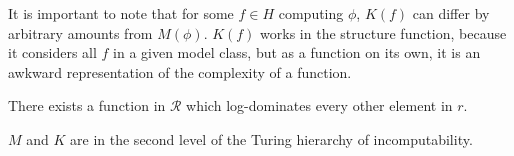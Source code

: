 \documentclass{style/llncs}
\newcommand{\R}{{\mathscr R}}
\begin{document}
{It is important to note that for some $f \in H$ computing $\phi$, $K(f)$ can differ by arbitrary amounts from $M(\phi)$. $K(f)$ works in the structure function, because it considers all $f$ in a given model class, but as a function on its own, it is an awkward representation of the complexity of a function.

\begin{theorem}
There exists a function in $\R$ which log-dominates every other element in $r$. 
\end{theorem}

\begin{theorem}
$M$ and $K$ are in the second level of the Turing hierarchy of incomputability. 
\end{theorem}

\begin{theorem}
\cite{DBLP:journals/cj/Shen99}

\end{theorem}
}



\end{document}
